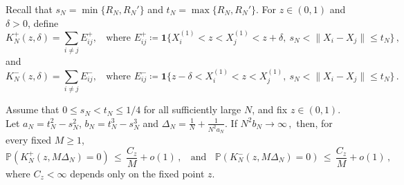 \documentclass[ECP,preprint]{ejpecp} %
\newcommand{\1}{\mathbf 1}
\newcommand{\PP}{\mathbb P}
\begin{document}
Recall that \( s_N = \min\{R_N, R_N'\} \) and \( t_N = \max\{R_N, R_N'\}\). For \(z\in(0,1)\) and \(\delta>0\), define
\[
    K_N^+(z,\delta)
    =
    \sum_{i\ne j} E^+_{ij} , 
    ~~~~ \mbox{where }
    E^+_{ij} \coloneqq
    \1\Big\{
    X_i^{(1)}<z<X_j^{(1)}<z+\delta, \ 
    s_N<\|X_i-X_j\|\le t_N
    \Big\} \, ,
\]
and
\[
    K_N^-(z,\delta)
    =
    \sum_{i\ne j} E^-_{ij} , 
    ~~~~ \mbox{where }
    E^-_{ij} \coloneqq \1\Big\{
    z-\delta<X_i^{(1)}<z<X_j^{(1)}, \
    s_N<\|X_i-X_j\|\le t_N
    \Big\} \, .
\]

\begin{lemma} \label{lem:localization}
Assume that \(0\le s_N<t_N\le1/4\) for all sufficiently large \(N\), and fix \(z\in(0,1)\). Let \(a_N = t_N^2 - s_N^2 \), \(b_N = t_N^3 - s_N^3 \) and 
\(
    \Delta_N
    =
    \frac1N+\frac{1}{N^2a_N}.
\) 
If
\(
    N^2 b_N\to\infty \, ,
\)
then, for every fixed \(M\ge1\),
\[
    \PP\left(
        K_N^+(z,M\Delta_N)=0
    \right)
    \, \le \,
    \frac{C_z}{M}+o(1) \, ,
    ~~~~
    \mbox{and}
    ~~~~
    \PP\left(
        K_N^-(z,M\Delta_N)=0
    \right)
    \, \le \, 
    \frac{C_z}{M}+o(1) \, ,
\]
where \(C_z<\infty\) depends only on the fixed point \(z\).
\end{lemma}
\end{document}
